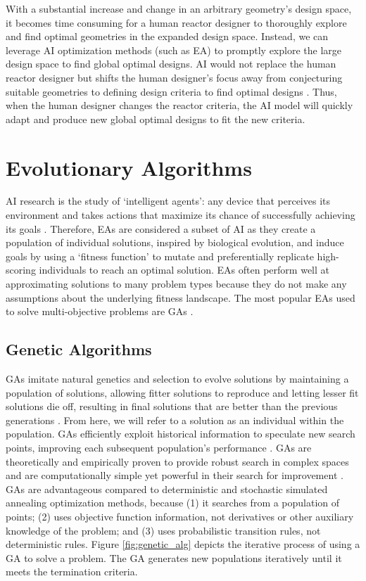 With a substantial increase and change in an arbitrary geometry's design space, 
it becomes time consuming for a human reactor designer to thoroughly explore 
and find optimal geometries in the expanded design space. 
Instead, we can leverage \gls{AI} optimization methods (such as \gls{EA}) to 
promptly explore the large design space to find global optimal designs. 
\gls{AI} would not replace the human reactor designer but shifts the human 
designer's focus away from conjecturing suitable geometries to defining design 
criteria to find optimal designs \cite{sobes_artificial_2020}. 
Thus, when the human designer changes the reactor criteria, the \gls{AI} 
model will quickly adapt and produce new global optimal designs to fit the new 
criteria.  

\section{Evolutionary Algorithms} 
\gls{AI} research is the study of `intelligent agents': any device that perceives 
its environment and takes actions that maximize its chance of successfully 
achieving its goals \cite{david_l_poole_computational_1998}.
Therefore, \glspl{EA} are considered a subset of \gls{AI} as they create a population 
of individual solutions, inspired by biological evolution, and induce goals by 
using a `fitness function' to mutate and preferentially replicate high-scoring 
individuals to reach an optimal solution.
\glspl{EA} often perform well at approximating solutions to many 
problem types because they do not make any assumptions about the 
underlying fitness landscape.
The most popular \glspl{EA} used to solve multi-objective problems are \glspl{GA} 
\cite{byrne_evolving_2014, krish_practical_2011}. 

\subsection{Genetic Algorithms}
\glspl{GA} imitate natural genetics and selection to evolve solutions 
by maintaining a population of solutions, allowing fitter solutions to reproduce
and letting lesser fit solutions die off, resulting in final solutions that are 
better than the previous generations \cite{renner_genetic_2003}. 
From here, we will refer to a solution as an individual within the population. 
\glspl{GA} efficiently exploit historical information to speculate new search 
points, improving each subsequent population's performance 
\cite{goldberg_genetic_1989}. 
\glspl{GA} are theoretically and empirically proven to provide robust 
search in complex spaces and are computationally simple yet powerful 
in their search for improvement \cite{goldberg_genetic_1989}. 
GAs are advantageous compared to deterministic and stochastic simulated 
annealing optimization methods, because (1) it searches from a population of 
points; (2) uses objective function information, not derivatives or other 
auxiliary knowledge of the problem; and (3) uses probabilistic transition 
rules, not deterministic rules. 
Figure \ref{fig:genetic_alg} depicts the iterative process of using a \gls{GA}
to solve a problem. 
The \gls{GA} generates new populations iteratively until it meets the termination 
criteria. 

